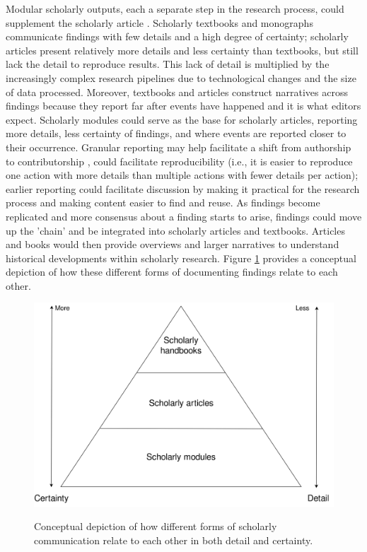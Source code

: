 \documentclass[publications,article,submit,moreauthors,pdftex,10pt,a4paper]{Definitions/mdpi}
\begin{document}
Modular scholarly outputs, each a separate step in the research
process, could supplement the scholarly article \citep[as detailed
  in][]{doi:10.3390/publications6020021}. Scholarly textbooks and
monographs \citep[i.e., vademecum science;][]{isbn:9780226253251}
communicate findings with few details and a high degree of certainty;
scholarly articles present relatively more details and less certainty
than textbooks, but still lack the detail to reproduce results. This
lack of detail is multiplied by the increasingly complex research
pipelines due to technological changes and the size of data
processed. Moreover, textbooks and articles construct narratives
across findings because they report far after events have happened and
it is what editors expect. Scholarly modules could serve as the base
for scholarly articles, reporting more details, less certainty of
findings, and where events are reported closer to their
occurrence. Granular reporting may help facilitate a shift from
authorship to contributorship \citep{doi:10.31234/osf.io/dt6e8}, could
facilitate reproducibility (i.e., it is easier to reproduce one action
with more details than multiple actions with fewer details per
action); earlier reporting could facilitate discussion by making it
practical for the research process \citep[extending the idea of
  Registered Reports;][]{doi:10.1016/j.cortex.2012.12.016} and making
content easier to find and reuse. As findings become replicated and
more consensus about a finding starts to arise, findings could move up
the 'chain' and be integrated into scholarly articles and
textbooks. Articles and books would then provide overviews and larger
narratives to understand historical developments within scholarly
research. Figure \ref{fig:datcom-fig1} provides a conceptual depiction
of how these different forms of documenting findings relate to each
other.

\begin{figure}
{\centering \includegraphics[width=1\linewidth]{fig1}}
\caption{Conceptual depiction of how different forms of scholarly communication relate to each other in both detail and certainty.}
\label{fig:datcom-fig1}
\end{figure}
\end{document}
